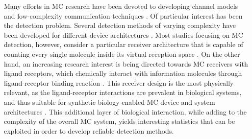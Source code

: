 \documentclass[twocolumn]{IEEEtran}
\begin{document}
Many efforts in MC research have been devoted to developing channel models and low-complexity communication techniques \cite{akyildiz2019moving, jamali2019channel, kuscu2011physical, kuscu2019transmitter, farsad2016comprehensive}. Of particular interest has been the detection problem. Several detection methods of varying complexity have been developed for different device architectures \cite{kuscu2019transmitter, kilinc2013receiver, li2019csi, li2015low}. Most studies focusing on MC detection, however, consider a particular receiver architecture that is capable of counting every single molecule inside its virtual reception space \cite{pierobon2011diffusion, kuscu2019transmitter}. On the other hand, an increasing research interest is being directed towards MC receivers with ligand receptors, which chemically interact with information molecules through ligand-receptor binding reaction \cite{pierobon2011noise, chou2015maximum, kuscu2018modeling, kuscu2016physical, kuscu2016modeling}. This receiver design is the most physically relevant, as the ligand-receptor interactions are prevalent in biological systems, and thus suitable for synthetic biology-enabled MC device and system architectures \cite{bialek2012biophysics, soldner2019survey, unluturk2015genetically}. This additional layer of biological interaction, while adding to the complexity of the overall MC system, yields interesting statistics that can be exploited in order to develop reliable detection methods.  


\end{document}
